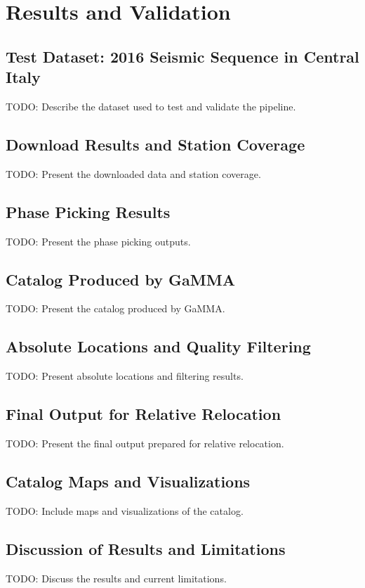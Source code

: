 \chapter{Results and Validation}

\section{Test Dataset: 2016 Seismic Sequence in Central Italy}
TODO: Describe the dataset used to test and validate the pipeline.

\section{Download Results and Station Coverage}
TODO: Present the downloaded data and station coverage.

\section{Phase Picking Results}
TODO: Present the phase picking outputs.

\section{Catalog Produced by GaMMA}
TODO: Present the catalog produced by GaMMA.

\section{Absolute Locations and Quality Filtering}
TODO: Present absolute locations and filtering results.

\section{Final Output for Relative Relocation}
TODO: Present the final output prepared for relative relocation.

\section{Catalog Maps and Visualizations}
TODO: Include maps and visualizations of the catalog.

\section{Discussion of Results and Limitations}
TODO: Discuss the results and current limitations.
